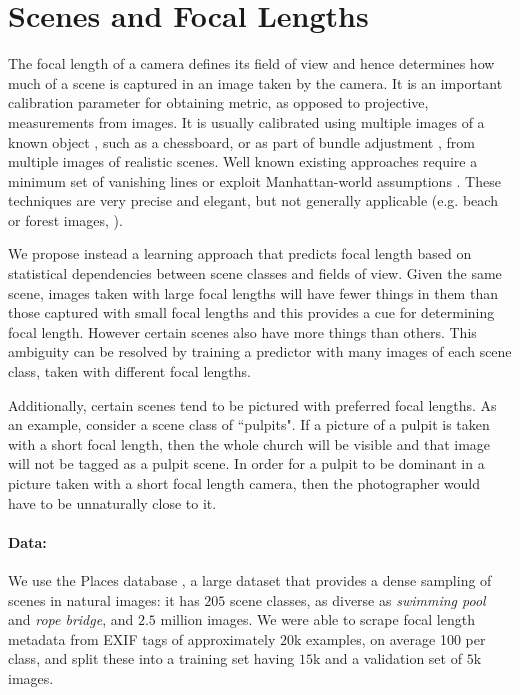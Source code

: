 \section{Scenes and Focal Lengths}
The focal length of a camera defines its field of view and hence determines how much of a scene is captured in an image taken by the camera. It is an important calibration parameter for obtaining metric, as opposed to projective, measurements from images. It is usually calibrated using multiple images of a known object \cite{zhang2000flexible}, such as a chessboard, or as part of bundle adjustment \cite{triggs2000bundle}, from multiple images of realistic scenes. Well known existing approaches require a minimum set of vanishing lines  \cite{wang1991camera} or exploit Manhattan-world assumptions \cite{caprile1990using}. These techniques are very precise and elegant, but not generally applicable (e.g. beach or forest images, \etc).

We propose instead a learning approach that predicts focal length based on statistical dependencies between scene classes and fields of view. Given the same scene, images taken with large focal lengths will have fewer things in them than those captured with small focal lengths and this provides a cue for determining focal length. However certain scenes also have more things than others. This ambiguity can be resolved by training a predictor with many images of each scene class, taken with different focal lengths. 

Additionally, certain scenes tend to be pictured with preferred focal lengths. As an example, consider a scene class of ``pulpits". If a picture of a pulpit is taken with a short focal length, then the whole church will be visible and that image will not be tagged as a pulpit scene. In order for a pulpit to be dominant in a picture taken with a short focal length camera, then the photographer would have to be unnaturally close to it. 

\paragraph{Data:} We use the Places database \cite{zhou2014learning}, a large dataset that provides a dense sampling of scenes in natural images: it has $205$ scene classes, as diverse as \textit{swimming pool} and \textit{rope bridge}, and $2.5$ million images. We were able to scrape focal length metadata from EXIF tags of approximately $20$k examples, on average 100 per class, and split these into a training set having $15$k and a validation set of $5$k images. 

